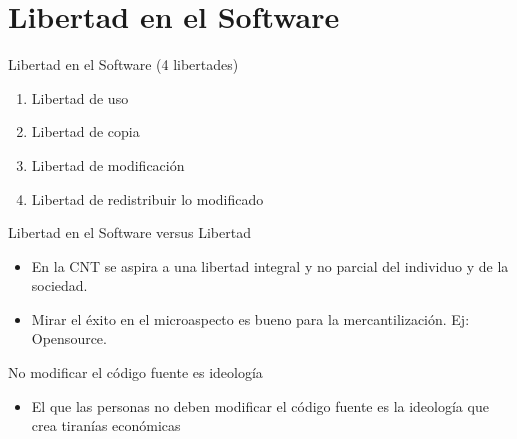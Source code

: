 \documentclass[bigger]{beamer}
\begin{document}
\section{Libertad en el Software}
\label{sec-2}
\begin{frame}[label=sec-2-1]{Libertad en el Software (4 libertades)}
\begin{enumerate}
\item Libertad de uso
\item Libertad de copia
\item Libertad de modificación
\item Libertad de redistribuir lo modificado
\end{enumerate}
\end{frame}
\begin{frame}[label=sec-2-2]{Libertad en el Software versus Libertad}
\begin{itemize}
\item En la CNT se aspira a una libertad integral y no parcial del individuo y de la sociedad.
\item Mirar el éxito en el microaspecto es bueno para la mercantilización. Ej: Opensource.
\end{itemize}
\end{frame}

\begin{frame}[label=sec-2-3]{No modificar el código fuente es ideología}
\begin{itemize}
\item El que las personas no deben modificar el código fuente es la ideología que crea tiranías económicas
\end{itemize}
\end{frame}
\end{document}
